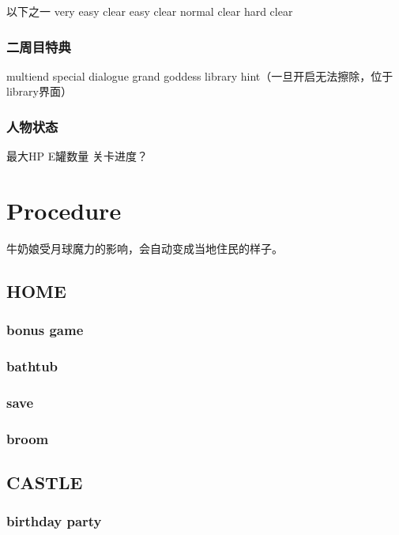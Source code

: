 \documentclass{article}
\begin{document}
以下之一
very easy clear
easy clear
normal clear
hard clear

\subsubsection{二周目特典}

multiend
special dialogue
grand goddess
library hint（一旦开启无法擦除，位于library界面）

\subsubsection{人物状态}

最大HP
E罐数量
关卡进度？


\section{Procedure}

牛奶娘受月球魔力的影响，会自动变成当地住民的样子。

\subsection{HOME}

\subsubsection{bonus game}

\subsubsection{bathtub}

\subsubsection{save}

\subsubsection{broom}

\subsection{CASTLE}

\subsubsection{birthday party}
\end{document}
